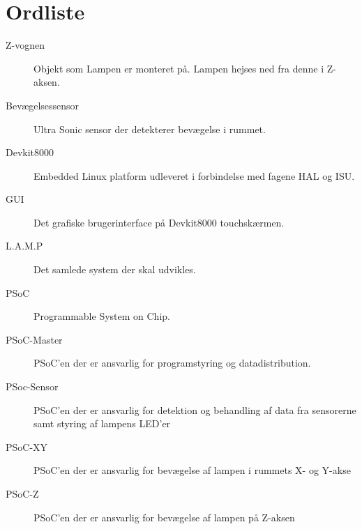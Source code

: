 \chapter{Ordliste}

\begin{description}
    \item [Z-vognen] Objekt som Lampen er monteret på. Lampen hejses ned fra denne i Z-aksen.
    \item [Bevægelsessensor] Ultra Sonic sensor der detekterer bevægelse i rummet.
    \item [Devkit8000] Embedded Linux platform udleveret i forbindelse med fagene HAL og ISU.
    \item [GUI] Det grafiske brugerinterface på Devkit8000 touchskærmen.
    \item [L.A.M.P] Det samlede system der skal udvikles.
    \item [PSoC] Programmable System on Chip.
    \item [PSoC-Master] PSoC'en der er ansvarlig for programstyring og datadistribution.
    \item [PSoc-Sensor] PSoC'en der er ansvarlig for detektion og behandling af data fra sensorerne samt styring af lampens LED'er
    \item [PSoC-XY] PSoC'en der er ansvarlig for bevægelse af lampen i rummets X- og Y-akse
    \item [PSoC-Z] PSoC'en der er ansvarlig for bevægelse af lampen på Z-aksen
    

\end{description}
